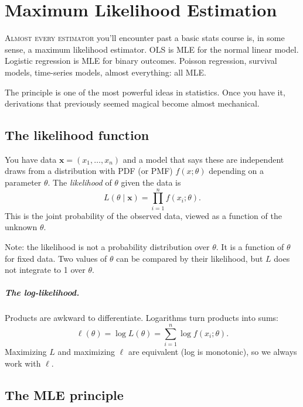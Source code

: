 \chapter{Maximum Likelihood Estimation}
\label{ch:mle}

\noindent\textsc{Almost every estimator} you'll encounter past a basic stats course is, in some sense, a maximum likelihood estimator. OLS is MLE for the normal linear model. Logistic regression is MLE for binary outcomes. Poisson regression, survival models, time-series models, almost everything: all MLE.

The principle is one of the most powerful ideas in statistics. Once you have it, derivations that previously seemed magical become almost mechanical.

\section{The likelihood function}

You have data $\bm{x} = (x_1, \ldots, x_n)$ and a model that says these are independent draws from a distribution with PDF (or PMF) $f(x; \theta)$ depending on a parameter $\theta$. The \emph{likelihood} of $\theta$ given the data is
\begin{equation}
  L(\theta \mid \bm{x}) = \prod_{i=1}^{n} f(x_i; \theta).
  \label{eq:likelihood-defn}
\end{equation}
This is the joint probability of the observed data, viewed as a function of the unknown $\theta$.

Note: the likelihood is not a probability distribution over $\theta$. It is a function of $\theta$ for fixed data. Two values of $\theta$ can be compared by their likelihood, but $L$ does not integrate to 1 over $\theta$.

\paragraph{The log-likelihood.} Products are awkward to differentiate. Logarithms turn products into sums:
\begin{equation}
  \ell(\theta) = \log L(\theta) = \sum_{i=1}^{n} \log f(x_i; \theta).
  \label{eq:log-likelihood-mle}
\end{equation}
Maximizing $L$ and maximizing $\ell$ are equivalent (log is monotonic), so we always work with $\ell$.

\section{The MLE principle}

